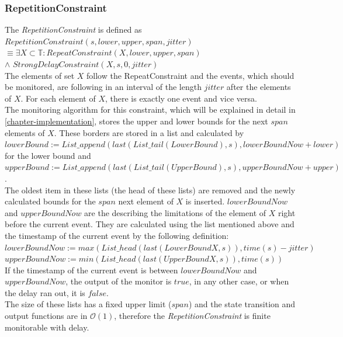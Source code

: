 \subsubsection{RepetitionConstraint}
	The \emph{RepetitionConstraint} is defined as\\[10pt]
		$RepetitionConstraint(s, lower, upper, span, jitter)$\\
		$\equiv \exists X\subset \mathbb{T}: RepeatConstraint (X, lower, upper, span)$\\
		\hspace{7cm}$\land$ $StrongDelayConstraint(X, s, 0, jitter)$\\[10pt]
	The elements of set $X$ follow the RepeatConstraint and the events, which should be monitored, are following in an interval of the length $jitter$ after the elements of $X$. For each element of $X$, there is exactly one event and vice versa.\\
	The monitoring algorithm for this constraint, which will be explained in detail in \ref{chapter-implementation}, stores the upper and lower bounds for the next $span$ elements of $X$.
	These borders are stored in a list and calculated by\\[10pt]
	$lowerBound:= List\_append(last(List\_tail(LowerBound), s), lowerBoundNow + lower)$ for the lower bound and\\
	$upperBound:= List\_append(last(List\_tail(UpperBound), s), upperBoundNow + upper)$.\\[10pt]
	The oldest item in these lists (the head of these lists) are removed and the newly calculated bounds for the $span$ next element of $X$ is inserted. $lowerBoundNow$ and $upperBoundNow$ are the describing the limitations of the element of $X$ right before the current event. They are calculated using the list mentioned above and the timestamp of the current event by the following definition:\\[10pt]
	$lowerBoundNow:= max(List\_head(last(LowerBoundX, s)), time(s)-jitter)$\\
	$upperBoundNow:= min(List\_head(last(UpperBoundX, s)), time(s))$\\[10pt]
	If the timestamp of the current event is between $lowerBoundNow$ and $upperBoundNow$, the output of the monitor is $true$, in any other case, or when the delay ran out, it is $false$.\\
	The size of these lists has a fixed upper limit ($span$) and the state transition and output functions are in $\mathcal{O}(1)$, therefore the \emph{RepetitionConstraint} is finite monitorable with delay.
	
